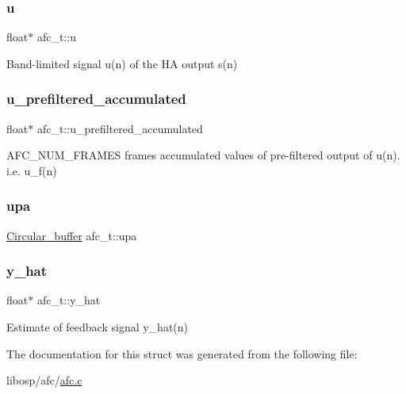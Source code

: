 \mbox{\label{structafc__t_aa69482203264d41b13f96cda153faec3}} 
\subsubsection{\texorpdfstring{u}{u}}
{\footnotesize\ttfamily float$\ast$ afc\+\_\+t\+::u}



Band-\/limited signal u(n) of the HA output s(n) 

\mbox{\label{structafc__t_af7b50d899dcdfc8c68f6866764861f5f}} 
\subsubsection{\texorpdfstring{u\+\_\+prefiltered\+\_\+accumulated}{u\_prefiltered\_accumulated}}
{\footnotesize\ttfamily float$\ast$ afc\+\_\+t\+::u\+\_\+prefiltered\+\_\+accumulated}



A\+F\+C\+\_\+\+N\+U\+M\+\_\+\+F\+R\+A\+M\+ES frames accumulated values of pre-\/filtered output of u(n). i.\+e. u\+\_\+f(n) 

\mbox{\label{structafc__t_a11328ef1f3d92c69c404c5df7761116a}} 
\subsubsection{\texorpdfstring{upa}{upa}}
{\footnotesize\ttfamily \mbox{\hyperlink{circular__buffer_8h_aa88184dd60879f696cb2e679d0e50b45}{Circular\+\_\+buffer}} afc\+\_\+t\+::upa}

\mbox{\label{structafc__t_a7c5db3530c08c1bec07d6f4bf921537d}} 
\subsubsection{\texorpdfstring{y\+\_\+hat}{y\_hat}}
{\footnotesize\ttfamily float$\ast$ afc\+\_\+t\+::y\+\_\+hat}



Estimate of feedback signal y\+\_\+hat(n) 



The documentation for this struct was generated from the following file\+:\begin{DoxyCompactItemize}
\item 
libosp/afc/\mbox{\hyperlink{afc_8c}{afc.\+c}}\end{DoxyCompactItemize}
